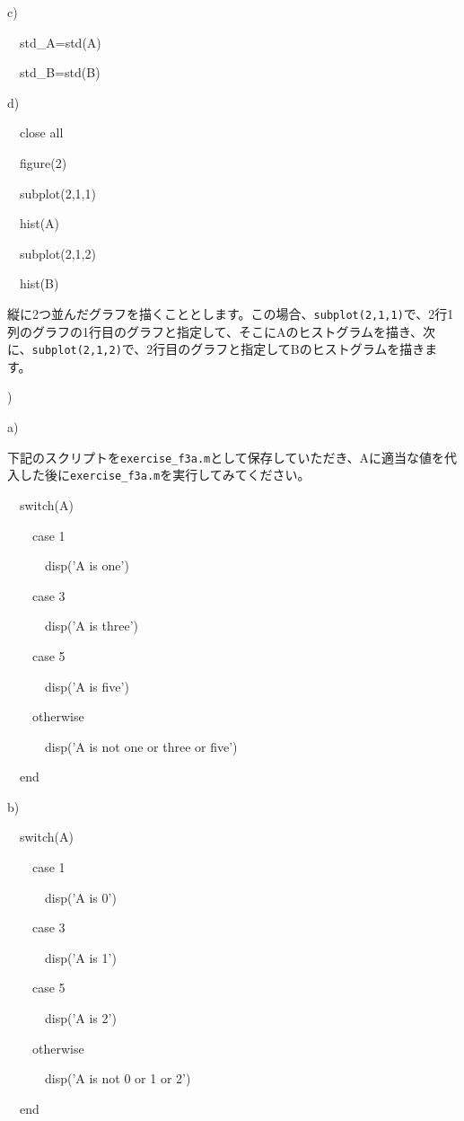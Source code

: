 \documentclass{jsarticle}
\begin{document}
\bigskip

c) {\tt

\ \ std\_A=std(A)

\ \ std\_B=std(B)
}

\bigskip

d) {\tt

\ \ close all

\ \ figure(2)

\ \ subplot(2,1,1)

\ \ hist(A)

\ \ subplot(2,1,2)

\ \ hist(B)
}

\begin{screen}
縦に2つ並んだグラフを描くこととします。この場合、{\tt subplot(2,1,1)}で、2行1列のグラフの1行目のグラフと指定して、そこにAのヒストグラムを描き、次に、{\tt subplot(2,1,2)}で、2行目のグラフと指定してBのヒストグラムを描きます。
\end{screen}

\bigskip


)

a)

\begin{screen}
下記のスクリプトを{\tt exercise\_f3a.m}として保存していただき、Aに適当な値を代入した後に{\tt exercise\_f3a.m}を実行してみてください。
\end{screen}

{\tt

\ \ switch(A)

\ \ \ \ case 1

\ \ \ \ \ \ disp('A is one')

\ \ \ \ case 3

\ \ \ \ \ \ disp('A is three')

\ \ \ \ case 5

\ \ \ \ \ \ disp('A is five')

\ \ \ \ otherwise

\ \ \ \ \ \ disp('A is not one or three or five')

\ \ end
}

\bigskip

b)

{\tt

\ \ switch(A)

\ \ \ \ case 1

\ \ \ \ \ \ disp('A is 0')

\ \ \ \ case 3

\ \ \ \ \ \ disp('A is 1')

\ \ \ \ case 5

\ \ \ \ \ \ disp('A is 2')

\ \ \ \ otherwise

\ \ \ \ \ \ disp('A is not 0 or 1 or 2')

\ \ end
}
\end{document}
